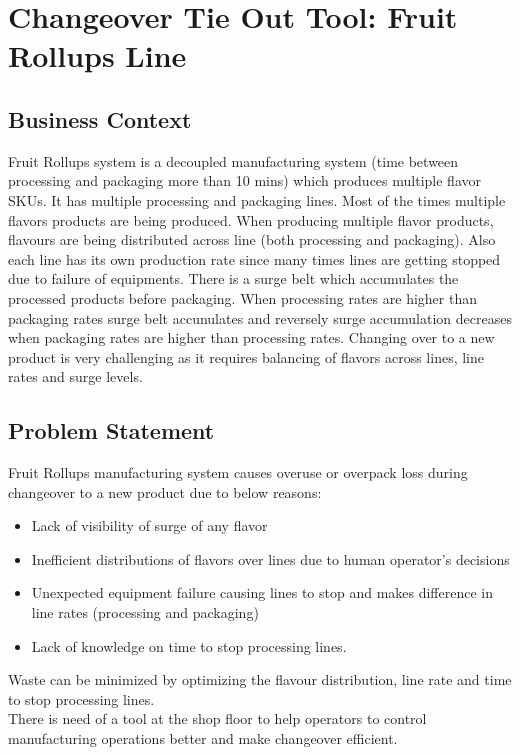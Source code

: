 \documentclass[a4paper,10pt]{article}
\begin{document}
\clearpage
\section*{Changeover Tie Out Tool: Fruit Rollups Line}

\subsection*{Business Context}
Fruit Rollups system is a decoupled manufacturing system (time between 
processing and packaging more than 10 mins) which produces multiple flavor 
SKUs. It has multiple processing and packaging lines. Most of the times 
multiple flavors products are being produced. When producing multiple 
flavor products, flavours are being distributed across line (both 
processing and packaging). Also each line has its own production rate 
since many times lines are getting stopped due to failure of equipments. 
There is a surge belt which accumulates the processed products before 
packaging. When processing rates are higher than packaging rates surge 
belt accunulates and reversely surge accumulation decreases when packaging 
rates are higher than processing rates. Changing over to a new product 
is very challenging as it requires balancing of flavors across lines, 
line rates and surge levels.


\subsection*{Problem Statement}
Fruit Rollups manufacturing system causes overuse or overpack loss during 
changeover to a new product due to below reasons:
\begin{itemize}
  \item Lack of visibility of surge of any flavor
  \item Inefficient distributions of flavors over lines due to human 
  operator's decisions
  \item Unexpected equipment failure causing lines to stop and makes 
  difference in line rates (processing and packaging)
  \item Lack of knowledge on time to stop processing lines.
\end{itemize}
Waste can be minimized by optimizing the flavour distribution, line rate 
and time to stop processing lines.
\\
There is need of a tool at the shop floor to help operators to control
manufacturing operations better and make changeover efficient.
\end{document}
